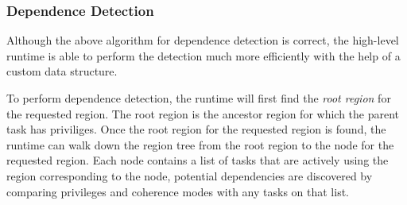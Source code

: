 

\subsubsection{Dependence Detection}
\label{subsec:depdetect}

Although the above algorithm for dependence detection is correct, the
high-level runtime is able to perform the detection much more efficiently with
the help of a custom data structure.

To perform dependence detection, the runtime will first find the {\em root region} for the 
requested region.  The root region is the ancestor region for which the parent task
has priviliges.  Once the root region for the requested region is found, 
the runtime can walk down the region tree from the root region to the node
for the requested region.  Each node contains a list of tasks that are
actively using the region corresponding to the node, potential dependencies are
discovered by comparing privileges and coherence modes with any tasks on that
list.

